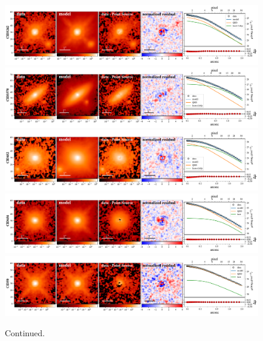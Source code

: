 \documentclass[apj]{emulateapj}
\begin{document}
\begin{figure}
\centering
{
\includegraphics[height=0.25\textwidth]{fig/best_fit_CID3242_SB_profile.pdf}
\includegraphics[height=0.25\textwidth]{fig/best_fit_CID3570_SB_profile.pdf}
\includegraphics[height=0.25\textwidth]{fig/best_fit_CID452_SB_profile.pdf}
\includegraphics[height=0.25\textwidth]{fig/best_fit_CID454_SB_profile.pdf}
\includegraphics[height=0.25\textwidth]{fig/best_fit_CID50_SB_profile.pdf}
}
\caption{\label{fig:ML} Continued.}
\end{figure} 
\end{document}
